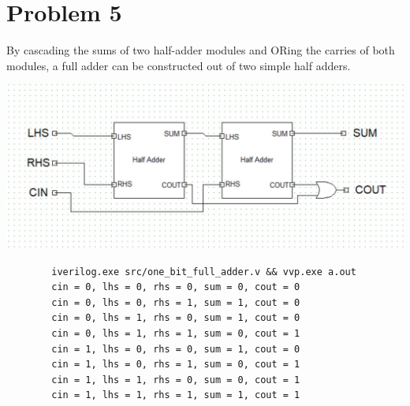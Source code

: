\documentclass{article}
\newenvironment{problem}[1]{
  \nobreak\section*{Problem #1}
}{}
\begin{document}
  \begin{problem}{5}
    By cascading the sums of two half-adder modules and ORing the carries of
    both modules, a full adder can be constructed out of two simple half adders.

    \begin{center}
      
    \end{center}

    \begin{center}
      \includegraphics[scale=0.6]{images/one_bit_full_adder.jpg}
    \end{center}

    \begin{center}
      \begin{lstlisting}
        iverilog.exe src/one_bit_full_adder.v && vvp.exe a.out
        cin = 0, lhs = 0, rhs = 0, sum = 0, cout = 0
        cin = 0, lhs = 0, rhs = 1, sum = 1, cout = 0
        cin = 0, lhs = 1, rhs = 0, sum = 1, cout = 0
        cin = 0, lhs = 1, rhs = 1, sum = 0, cout = 1
        cin = 1, lhs = 0, rhs = 0, sum = 1, cout = 0
        cin = 1, lhs = 0, rhs = 1, sum = 0, cout = 1
        cin = 1, lhs = 1, rhs = 0, sum = 0, cout = 1
        cin = 1, lhs = 1, rhs = 1, sum = 1, cout = 1
      \end{lstlisting}
    \end{center}
  \end{problem}
\end{document}
